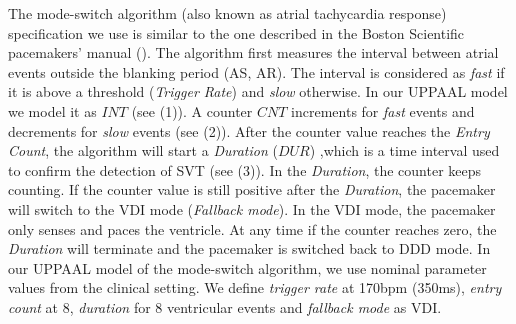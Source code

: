 The mode-switch algorithm (also known as atrial tachycardia response) specification we use is similar to the one described in the Boston Scientific pacemakers' manual (\cite{compass}). The algorithm first measures the interval between atrial events outside the blanking period (AS, AR). The interval is considered as \emph{fast} if it is above a threshold (\emph{Trigger Rate}) and \emph{slow} otherwise. In our UPPAAL model we model it as $INT$ (see  (1)). A counter $CNT$ increments for \emph{fast} events and decrements for \emph{slow} events (see  (2)). After the counter value reaches the \emph{Entry Count}, the algorithm will start a \emph{Duration} ($DUR$) ,which is a time interval used to confirm the detection of SVT (see  (3)). In the \emph{Duration}, the counter keeps counting. If the counter value is still positive after the \emph{Duration}, the pacemaker will switch to the VDI mode (\emph{Fallback mode}). In the VDI mode, the pacemaker only senses and paces the ventricle. At any time if the counter reaches zero, the \emph{Duration} will terminate and the pacemaker is switched back to DDD mode.
In our UPPAAL model of the mode-switch algorithm, we use nominal parameter values from the clinical setting. We define \emph{trigger rate} at 170bpm (350ms), \emph{entry count} at 8, \emph{duration} for 8 ventricular events and \emph{fallback mode} as VDI. 
